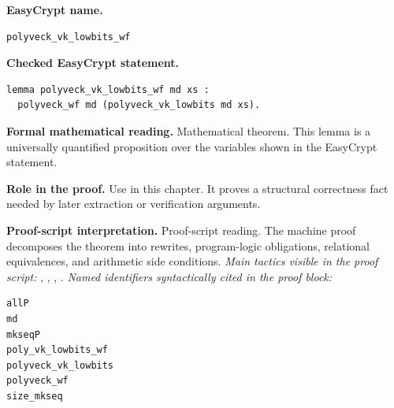 \begin{formaltheorem}
\noindent\textbf{EasyCrypt name.}
\begin{lstlisting}[language=EasyCrypt,basicstyle=\ttfamily\scriptsize]
polyveck_vk_lowbits_wf
\end{lstlisting}
\noindent\textbf{Checked EasyCrypt statement.}
\begin{lstlisting}[language=EasyCrypt,basicstyle=\ttfamily\scriptsize]
lemma polyveck_vk_lowbits_wf md xs :
  polyveck_wf md (polyveck_vk_lowbits md xs).
\end{lstlisting}
\noindent\textbf{Formal mathematical reading.}
Mathematical theorem. This lemma is a universally quantified proposition over the variables shown in the EasyCrypt statement.

\noindent\textbf{Role in the proof.}
Use in this chapter. It proves a structural correctness fact needed by later extraction or verification arguments.

\noindent\textbf{Proof-script interpretation.}
Proof-script reading. The machine proof decomposes the theorem into rewrites, program-logic obligations, relational equivalences, and arithmetic side conditions.
\emph{Main tactics visible in the proof script:} , , , .
\emph{Named identifiers syntactically cited in the proof block:}
\begin{lstlisting}[language=EasyCrypt,basicstyle=\ttfamily\scriptsize]
allP
md
mkseqP
poly_vk_lowbits_wf
polyveck_vk_lowbits
polyveck_wf
size_mkseq
\end{lstlisting}

\end{formaltheorem}

